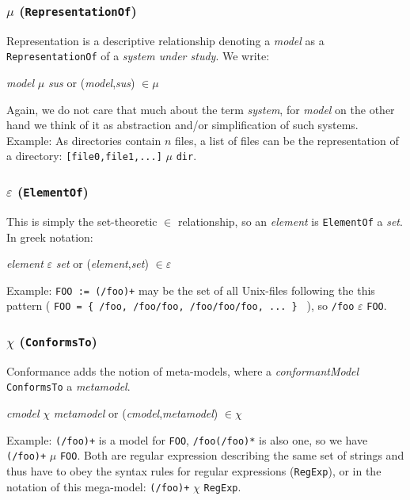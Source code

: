 \subsubsection{$\mu$ (\texttt{RepresentationOf})}
Representation is a descriptive relationship denoting a \textit{model} as a \texttt{RepresentationOf} of a \textit{system under study}. We write:
\begin{center}
\textit{model} $\mu$ \textit{sus}
or 
(\textit{model},\textit{sus}) $\in\mu$
\end{center}
Again, we do not care that much about the term \textit{system}, for \textit{model} on the other hand we think of it as abstraction and/or simplification of such systems.
Example: As directories contain $n$ files, a list of files can be the representation of a directory: \texttt{[file0,file1,...]} $\mu$ \texttt{dir}.

\subsubsection{$\varepsilon$ (\texttt{ElementOf})}
This is simply the set-theoretic $\in$ relationship, so an \textit{element} is \texttt{ElementOf} a \textit{set}. In greek notation:
\begin{center}
\textit{element} $\varepsilon$ \textit{set}
or 
(\textit{element},\textit{set}) $\in\varepsilon$
\end{center}
Example: \texttt{FOO := (/foo)+}  may be the set of all Unix-files following the this pattern ( \texttt{FOO = \{ /foo, /foo/foo, /foo/foo/foo, ... \} } ), so \texttt{/foo} $\varepsilon$ \texttt{FOO}.

\subsubsection{$\chi$ (\texttt{ConformsTo})} Conformance adds the notion of meta-models, where a \textit{conformantModel} \texttt{ConformsTo} a \textit{metamodel}.
\begin{center}
\textit{cmodel} $\chi$ \textit{metamodel}
or 
(\textit{cmodel},\textit{metamodel}) $\in\chi$
\end{center}
Example: \texttt{(/foo)+} is a model for \texttt{FOO}, \texttt{/foo(/foo)*} is also one, so we have \texttt{(/foo)+} $\mu$ \texttt{FOO}. Both are regular expression describing the same set of strings and thus have to obey the syntax rules for regular expressions (\texttt{RegExp}), or in the notation of this mega-model: \texttt{(/foo)+} $\chi$ \texttt{RegExp}.

